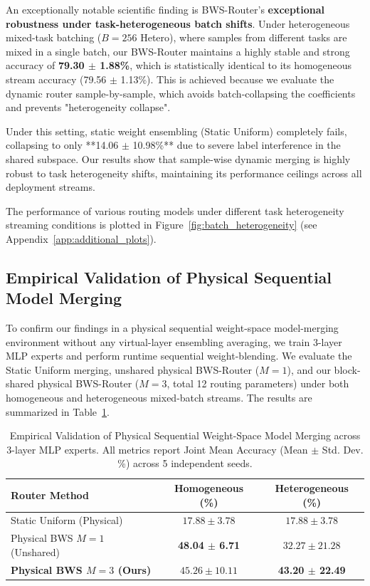 An exceptionally notable scientific finding is BWS-Router's \textbf{exceptional robustness under task-heterogeneous batch shifts}. Under heterogeneous mixed-task batching ($B=256$ Hetero), where samples from different tasks are mixed in a single batch, our BWS-Router maintains a highly stable and strong accuracy of \textbf{79.30 $\pm$ 1.88\%}, which is statistically identical to its homogeneous stream accuracy (79.56 $\pm$ 1.13\%). This is achieved because we evaluate the dynamic router sample-by-sample, which avoids batch-collapsing the coefficients and prevents "heterogeneity collapse". 

Under this setting, static weight ensembling (Static Uniform) completely fails, collapsing to only **14.06 $\pm$ 10.98\%** due to severe label interference in the shared subspace. Our results show that sample-wise dynamic merging is highly robust to task heterogeneity shifts, maintaining its performance ceilings across all deployment streams.

The performance of various routing models under different task heterogeneity streaming conditions is plotted in Figure~\ref{fig:batch_heterogeneity} (see Appendix~\ref{app:additional_plots}).

\subsection{Empirical Validation of Physical Sequential Model Merging}
To confirm our findings in a physical sequential weight-space model-merging environment without any virtual-layer ensembling averaging, we train 3-layer MLP experts and perform runtime sequential weight-blending. We evaluate the Static Uniform merging, unshared physical BWS-Router ($M=1$), and our block-shared physical BWS-Router ($M=3$, total 12 routing parameters) under both homogeneous and heterogeneous mixed-batch streams. The results are summarized in Table~\ref{tab:physical_merging_results}.

\begin{table}[h]
\caption{Empirical Validation of Physical Sequential Weight-Space Model Merging across 3-layer MLP experts. All metrics report Joint Mean Accuracy (Mean $\pm$ Std. Dev. \%) across 5 independent seeds.}
\label{tab:physical_merging_results}
\vskip 0.1in
\begin{center}
\begin{small}
\setlength{\tabcolsep}{4pt}
\begin{tabular}{lcc}
\toprule
\textbf{Router Method} & \textbf{Homogeneous (\%)} & \textbf{Heterogeneous (\%)} \\
\midrule
Static Uniform (Physical) & $17.88 \pm 3.78$ & $17.88 \pm 3.78$ \\
\midrule
Physical BWS $M=1$ (Unshared) & \textbf{48.04 $\pm$ 6.71} & $32.27 \pm 21.28$ \\
\textbf{Physical BWS $M=3$ (Ours)} & $45.26 \pm 10.11$ & \textbf{43.20 $\pm$ 22.49} \\
\bottomrule
\end{tabular}
\end{small}
\end{center}
\vskip -0.1in
\end{table}

